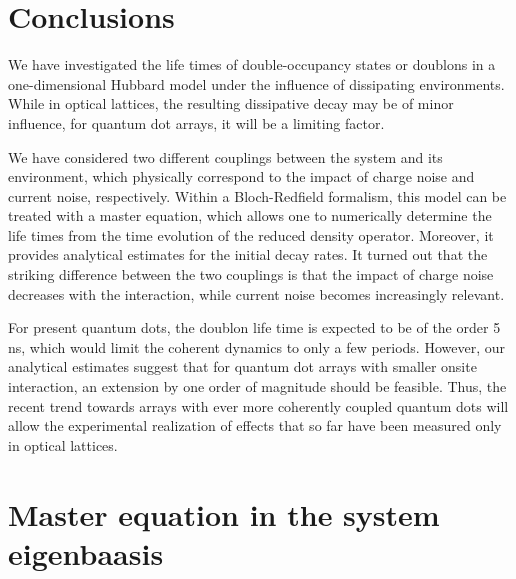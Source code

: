 \documentclass[twocolumn,prb,showpacs]{revtex4-1}
\begin{document}
\section{Conclusions}

We have investigated the life times of double-occupancy states or doublons
in a one-dimensional Hubbard model under the influence of dissipating
environments.  While in optical lattices, the resulting dissipative decay
may be of minor influence, for quantum dot arrays, it will be a limiting
factor.

We have considered two different couplings between the system and its
environment, which physically correspond to the impact of charge noise and
current noise, respectively.  Within a Bloch-Redfield formalism, this model
can be treated with a master equation, which allows one to
numerically determine the life times from the time evolution of the reduced
density operator.  Moreover, it provides analytical estimates for the
initial decay rates.  It turned out that the striking difference between
the two couplings is that the impact of charge noise decreases with the
interaction, while current noise becomes increasingly relevant.

For present quantum dots, the doublon life time is expected to be of the
order 5\,ns, which would limit the coherent dynamics to only a few
periods.  However, our analytical estimates suggest that for quantum dot
arrays with smaller onsite interaction, an extension by one order of
magnitude should be feasible.  Thus, the recent trend towards arrays with
ever more coherently coupled quantum dots will allow the experimental
realization of effects that so far have been measured only in optical
lattices.


\appendix
\section{Master equation in the system eigenbaasis \label{app:masterequation}}
\end{document}
